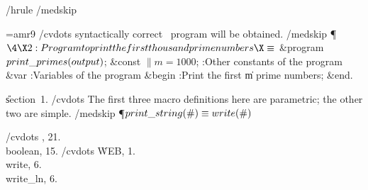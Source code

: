 \leftfloat
\ttverbatim
/hrule
/medskip

\font\ninerm=amr9
/cvdots
syntactically correct \PASCAL\ program will
be obtained.\]
/medskip
\Y\P$\4\X2:Program to print the first
thousand prime numbers\X\S$\6
\4\&{program}\1\  $\\{print\_primes}(%
\\{output})$;\6
\4\&{const} $\|m=1000$;\5
:Other constants of the program\X\6
\4\&{var} :Variables of the program\X\6
\&{begin} :Print the first \|m prime
numbers\X;\6
\&{end}.\par
\U section~1.\fi
/cvdots
The first three macro definitions here are
parametric; the other two are simple.\]
/medskip
\Y\P\D {}$\\{print\_string}(\#)\S\\{write}(%
\#)$\par
/cvdots
\inx
{}, 21.
\:\\{boolean}, 15.
/cvdots
\:\.{WEB}, 1.
\:\\{write}, 6.
\:\\{write\_ln}, 6.
